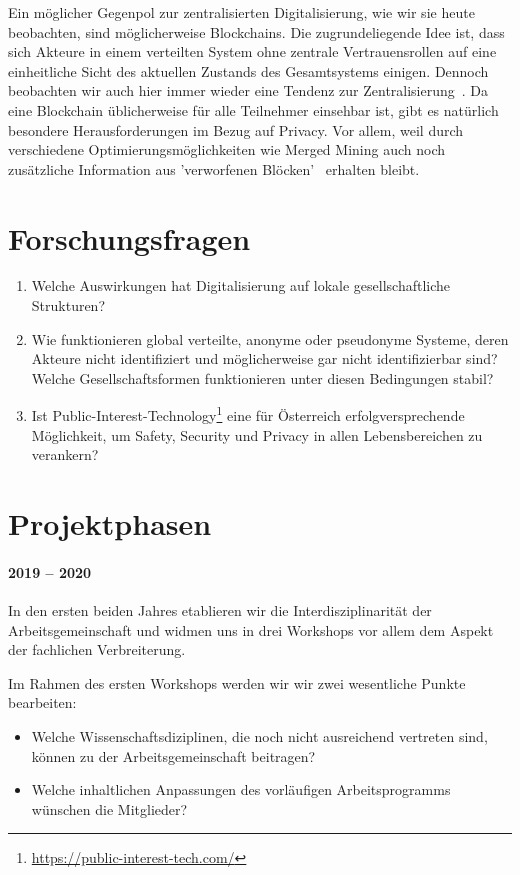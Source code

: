 \documentclass[11pt]{scrartcl}
\begin{document}
Ein möglicher Gegenpol zur zentralisierten Digitalisierung, wie wir sie heute beobachten, sind möglicherweise Blockchains. Die zugrundeliegende Idee ist, dass sich Akteure in einem verteilten System ohne zentrale Vertrauensrollen auf eine einheitliche Sicht des aktuellen Zustands des Gesamtsystems einigen. Dennoch  beobachten wir auch hier immer wieder eine Tendenz zur Zentralisierung~\cite{judmayer2017:mergedMining}. Da eine Blockchain üblicherweise für alle Teilnehmer einsehbar ist, gibt es natürlich besondere Herausforderungen im Bezug auf Privacy. Vor allem, weil durch verschiedene Optimierungsmöglichkeiten wie Merged Mining auch noch zusätzliche Information aus 'verworfenen Blöcken'~\cite{stifter2019:echoesOfThePast} erhalten bleibt.



\section{Forschungsfragen}

\begin{enumerate}
    \item Welche Auswirkungen hat Digitalisierung auf lokale gesellschaftliche Strukturen?
    \item Wie funktionieren global verteilte, anonyme oder pseudonyme Systeme, deren Akteure nicht identifiziert und möglicherweise gar nicht identifizierbar sind? Welche Gesellschaftsformen funktionieren unter diesen Bedingungen stabil?
    \item Ist Public-Interest-Technology\footnote{\url{https://public-interest-tech.com/}} eine für Österreich erfolgversprechende Möglichkeit, um Safety, Security und Privacy in allen Lebensbereichen zu verankern? 
\end{enumerate}


\section{Projektphasen}

\paragraph{2019 -- 2020}
In den ersten beiden Jahres etablieren wir die Interdisziplinarität der Arbeitsgemeinschaft und widmen uns in drei Workshops vor allem dem Aspekt der fachlichen Verbreiterung.

Im Rahmen des ersten Workshops werden wir wir zwei wesentliche Punkte bearbeiten:
\begin{itemize}
    \item Welche Wissenschaftsdiziplinen, die noch nicht ausreichend vertreten sind, können zu der Arbeitsgemeinschaft beitragen?
    \item Welche inhaltlichen Anpassungen des vorläufigen Arbeitsprogramms wünschen die Mitglieder?
\end{itemize}
\end{document}
